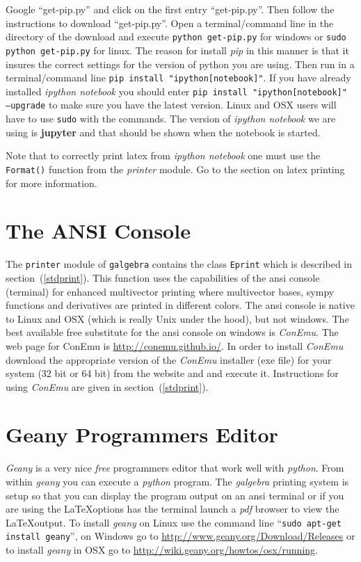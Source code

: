 \documentclass[12pt]{report}
\newcommand{\T}[1]{\texttt{#1}}
\begin{document}
Google ``get-pip.py'' and click on the first entry ``get-pip.py''.  Then follow the instructions to download ``get-pip.py''.  
Open a terminal/command line in the directory of the download and execute \T{python get-pip.py} for windows or \T{sudo python get-pip.py}
for linux.  The reason for install \emph{pip} in this manner is that it insures the correct settings for the version of 
python you are using. Then run in a terminal/command line
\T{pip install "ipython[notebook]"}.  If you have already installed \emph{ipython notebook} you should enter 
\T{pip install "ipython[notebook]" --upgrade} to make sure you have the latest version.  Linux and OSX users will have to
use \T{sudo} with the commands.  The version of \emph{ipython notebook} we are using is \textbf{jupyter} and that should be
shown when the notebook is started.

Note that to correctly print latex from \emph{ipython notebook} one must use the \T{Format()} function from the \emph{printer}
module.  Go to the section on latex printing for more information.

\section{The ANSI Console}

The \T{printer} module of \T{galgebra} contains the class \T{Eprint} which is described in section~(\ref{stdprint}). This function uses
the capabilities of the ansi console (terminal) for enhanced multivector printing where multivector bases, sympy functions and derivatives
are printed in different colors.  The ansi console is native to Linux and OSX (which is really Unix under the hood), but not windows.
The best available free substitute for
the ansi console on windows is \emph{ConEmu}.  The web page for ConEmu is \url{http://conemu.github.io/}.  In order to install \emph{ConEmu}
download the appropriate version of the \emph{ConEmu} installer (exe file) for your system (32 bit or 64 bit) from the website and and execute it. Instructions for using \emph{ConEmu} are given in section~(\ref{stdprint}).

\section{Geany Programmers Editor}

\emph{Geany} is a very nice \emph{free} programmers editor that work well with \emph{python}.  From within \emph{geany} you can execute a
\emph{python} program.  The \emph{galgebra} printing system is setup so that you can display the program output on an ansi terminal or if
you are using the \LaTeX options has the terminal launch a \emph{pdf} browser to view the \LaTeX output.  To install \emph{geany} on
Linux use the command line ``\T{sudo apt-get install geany}'', on Windows go to \url{http://www.geany.org/Download/Releases} or to install
\emph{geany} in OSX go to \url{http://wiki.geany.org/howtos/osx/running}.
\end{document}
